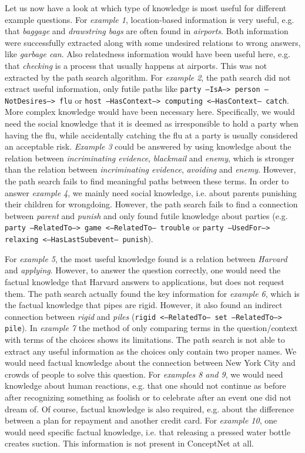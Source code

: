 \documentclass{article}
\begin{document}
Let us now have a look at which type of knowledge is most useful for
different example questions. For \emph{example 1}, location-based
information is very useful, e.g. that \emph{baggage} and
\emph{drawstring bags} are often found in \emph{airports}. Both
information were successfully extracted along with some undesired
relations to wrong answers, like \emph{garbage can}. Also relatedness
information would have been useful here, e.g. that \emph{checking} is
a process that usually happens at airports. This was not extracted by
the path search algorithm. For \emph{example 2}, the path search did
not extract useful information, only futile paths like \texttt{party
  --IsA--> person --NotDesires--> flu} or \texttt{host --HasContext-->
  computing <--HasContext-- catch}. More complex knowledge would have
been necessary here. Specifically, we would need the social knowledge
that it is deemed as irresponsible to hold a party when having the
flu, while accidentally catching the flu at a party is usually
considered an acceptable risk.  \emph{Example 3} could be answered by
using knowledge about the relation between \emph{incriminating
  evidence}, \emph{blackmail} and \emph{enemy}, which is stronger than
the relation between \emph{incriminating evidence}, \emph{avoiding}
and \emph{enemy}. However, the path search fails to find meaningful
paths between these terms. In order to answer \emph{example 4}, we
mainly need social knowledge, i.e. about parents punishing their
children for wrongdoing. However, the path search fails to find a
connection between \emph{parent} and \emph{punish} and only found
futile knowledge about parties (e.g. \texttt{party --RelatedTo--> game
  <--RelatedTo-- trouble} or \texttt{party --UsedFor--> relaxing
  <--HasLastSubevent-- punish}).

For \emph{example 5}, the most useful knowledge found is a relation
between \emph{Harvard} and \emph{applying}. However, to answer the
question correctly, one would need the factual knowledge that Harvard
answers to applications, but does not request them. The path search
actually found the key information for \emph{example 6}, which is the
factual knowledge that pipes are rigid. However, it also found an
indirect connection between \emph{rigid} and \emph{piles}
(\texttt{rigid <--RelatedTo-- set --RelatedTo--> pile}). In
\emph{example 7} the method of only comparing terms in the
question/context with terms of the choices shows its limitations.  The
path search is not able to extract any useful information as the
choices only contain two proper names. We would need factual knowledge
about the connection between New York City and crowds of people to
solve this question.  For \emph{examples 8 and 9}, we would need
knowledge about human reactions, e.g. that one should not continue as
before after recognizing something as foolish or to celebrate after an
event one did not dream of. Of course, factual knowledge is also
required, e.g. about the difference between a plan for repayment and
another credit card.  For \emph{example 10}, one would need specific
factual knowledge, i.e. that releasing a pressed water bottle creates
suction. This information is  not present in ConceptNet at all.
\end{document}
